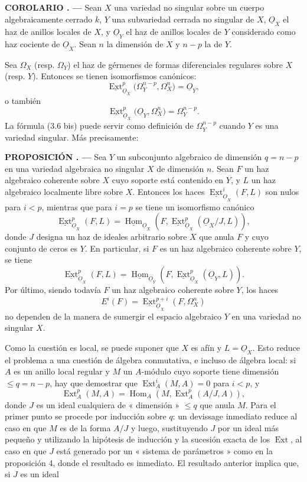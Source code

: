 \documentclass[11pt,twoside,openany]{book}
\numberwithin{equation}{section}
\newcommand{\src}[1]{%
  \phantomsection\hypertarget{src:#1}{}%
  \marginpar{\raggedleft\footnotesize\sffamily #1}%
}
\newcommand{\Osh}{\underline{O}}
\newcommand{\Homsh}{\underline{\operatorname{Hom}}}
\newcommand{\Extsh}{\underline{\operatorname{Ext}}}
\theoremstyle{plain}
\theoremstyle{definition}
\theoremstyle{remark}
\newcommand{\result}[2]{%
  \par\medskip\noindent\textbf{#1%
  \if\relax\detokenize{#2}\relax\else\space#2\fi. ---}\enspace
}
\newcommand{\FgaUnitKey}{frontmatter}
\renewcommand{\src}[1]{%
  \phantomsection\hypertarget{src:\FgaUnitKey:#1}{}%
  \marginpar{\raggedleft\footnotesize\sffamily #1}%
}
\theoremstyle{plain}
\theoremstyle{definition}
\theoremstyle{remark}
\begin{document}
\result{COROLARIO}{2} Sean $X$ una variedad no singular sobre un cuerpo
algebraicamente cerrado $k$, $Y$ una subvariedad cerrada no singular de $X$,
$\Osh_X$ el haz de anillos locales de $X$, y $\Osh_Y$ el haz de anillos
locales de $Y$ considerado como haz cociente de $\Osh_X$. Sean $n$ la
dimensión de $X$ y $n-p$ la de $Y$.

\src{176}
Sea $\Omega_X$ (resp. $\Omega_Y$) el haz de gérmenes de formas
diferenciales regulares sobre $X$ (resp. $Y$). Entonces se tienen isomorfismos
canónicos:
\begin{equation}\tag{3.6}
  \Extsh_{\Osh_X}^{p}\bigl(\Omega_Y^{n-p},\Omega_X^{n}\bigr)=\Osh_Y,
\end{equation}
o también
\begin{equation}\tag{3.6 bis}
  \Extsh_{\Osh_X}^{p}\bigl(\Osh_Y,\Omega_X^{n}\bigr)=\Omega_Y^{n-p}.
\end{equation}
La fórmula (3.6 bis) puede servir como definición de $\Omega_Y^{n-p}$ cuando $Y$
es una variedad singular. Más precisamente:

\result{PROPOSICIÓN}{5} Sea $Y$ un subconjunto algebraico de dimensión
$q=n-p$ en una variedad algebraica no singular $X$ de dimensión $n$. Sean
$F$ un haz algebraico coherente sobre $X$ cuyo soporte está contenido en $Y$, y $L$
un haz algebraico localmente libre sobre $X$. Entonces los haces
$\Extsh_{\Osh_X}^{i}(F,L)$ son nulos para $i<p$, mientras que para $i=p$ se tiene un
isomorfismo canónico
\begin{equation}\tag{3.7}
  \Extsh_{\Osh_X}^{p}(F,L)
  =\Homsh_{\Osh_X}\!\left(F,
  \Extsh_{\Osh_X}^{p}(\Osh_X/J,L)\right),
\end{equation}
donde $J$ designa un haz de ideales arbitrario sobre $X$ que anula $F$ y cuyo
conjunto de ceros es $Y$. En particular, si $F$ es un haz algebraico
coherente sobre $Y$, se tiene
\begin{equation}\tag{3.7 bis}
  \Extsh_{\Osh_X}^{p}(F,L)
  =\Homsh_{\Osh_Y}\!\left(F,\Extsh_{\Osh_X}^{p}(\Osh_Y,L)\right).
\end{equation}
Por último, siendo todavía $F$ un haz algebraico coherente sobre $Y$, los haces
\[
  E^{i}(F)=\Extsh_{\Osh_X}^{p+i}(F,\Omega_X^{n})
\]
no dependen de la manera de sumergir el espacio algebraico $Y$ en una variedad
no singular $X$.

Como la cuestión es local, se puede suponer que $X$ es afín y $L=\Osh_X$. Esto reduce
el problema a una cuestión de álgebra conmutativa, e incluso de álgebra local: si $A$ es un
anillo local regular y $M$ un $A$-módulo cuyo soporte tiene dimensión
$\leq q=n-p$, hay que demostrar que $\operatorname{Ext}_{A}^{i}(M,A)=0$ para $i<p$, y
\[
  \operatorname{Ext}_{A}^{p}(M,A)
  =\operatorname{Hom}_{A}\!\left(M,\operatorname{Ext}_{A}^{p}(A/J,A)\right),
\]
donde $J$ es un ideal cualquiera de « dimensión » $\leq q$ que anula $M$. Para el
primer punto se procede por inducción sobre $q$: un devissage inmediato reduce
al caso en que $M$ es de la forma $A/J$ y luego, sustituyendo $J$ por un ideal más
pequeño y utilizando la hipótesis de inducción y la sucesión exacta de los
$\operatorname{Ext}$, al caso en que $J$ está generado por un « sistema de parámetros »
como en la proposición 4, donde el resultado es inmediato. El resultado
anterior implica que, si $J$ es un ideal
\end{document}
